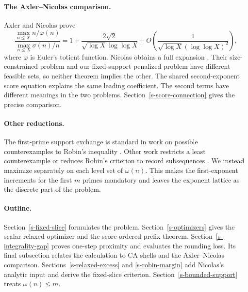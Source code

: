 \paragraph{The Axler--Nicolas comparison.}
Axler and Nicolas \cite{axler-nicolas-2023} prove
\[
    \frac{\displaystyle\max_{n\leq X}n/\varphi(n)}
         {\displaystyle\max_{n\leq X}\sigma(n)/n}
    =
    1+
    \frac{2\sqrt2}
         {\sqrt{\log X}\log\log X}
    +
    O\left(
        \frac1{\sqrt{\log X}(\log\log X)^2}
    \right),
\]
where \(\varphi\) is Euler's totient function. Nicolas obtains a full
expansion \cite[Theorem~1.2]{nicolas-2025}.
Their size-constrained problem and our fixed-support penalized problem have
different feasible sets, so neither theorem implies the other. The
shared second-exponent score equation explains the same leading
coefficient. The second terms have different meanings in the two
problems. Section~\ref{s-score-connection} gives the precise comparison.

\paragraph{Other reductions.}
The first-prime support exchange is standard in work on possible
counterexamples to Robin's inequality
\cite[Section~5, Lemma~9]{choie2007}. Other work restricts a least
counterexample or reduces Robin's criterion to record subsequences
\cite{akbary-friggstad-2009,nazardonyavi-yakubovich-2014}. We instead
maximize separately on each level set of \(\omega(n)\). This makes the
first-exponent increments for the first \(m\) primes mandatory and leaves
the exponent lattice as the discrete part of the problem.

\paragraph{Outline.}
Section~\ref{s-fixed-slice} formulates the problem.
Section~\ref{s-optimizers} gives the scalar relaxed optimizer and the
score-ordered prefix theorem.
Section~\ref{s-integrality-gap} proves one-step proximity and evaluates
the rounding loss. Its final subsection relates the calculation
to CA shells and the Axler--Nicolas comparison.
Sections~\ref{s-relaxed-excess} and \ref{s-robin-margin} add Nicolas's
analytic input and derive the fixed-slice criterion.
Section~\ref{s-bounded-support} treats \(\omega(n)\leq m\).
